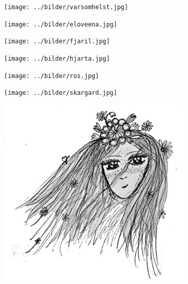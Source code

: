 
\sclearpage

\begin{intersong}
\begin{center}
\texttt{[image: ../bilder/varsomhelst.jpg]} 
\end{center}
\end{intersong}
\sclearpage

\sclearpage

\begin{intersong}
\begin{center}
\texttt{[image: ../bilder/eloveena.jpg]} 
\end{center}
\end{intersong}
\sclearpage

\begin{intersong}
\begin{center}
\texttt{[image: ../bilder/fjaril.jpg]} 
\end{center}
\end{intersong}
\sclearpage

\sclearpage

\begin{intersong}
\begin{center}
\texttt{[image: ../bilder/hjarta.jpg]} 
\end{center}
\end{intersong}
\sclearpage

\sclearpage

\sclearpage

\begin{intersong}
\begin{center}
\texttt{[image: ../bilder/ros.jpg]} 
\end{center}
\end{intersong}
\sclearpage

\begin{intersong}
\begin{center}
\texttt{[image: ../bilder/skargard.jpg]} 
\end{center}
\end{intersong}
\sclearpage

\sclearpage

\begin{intersong}
	\begin{center}
		\includegraphics[width=0.7\textwidth]{../bilder/fardigabilder/CamillasFardigaBilder/Svinstaskar2.png} 
	\end{center}
\end{intersong}
